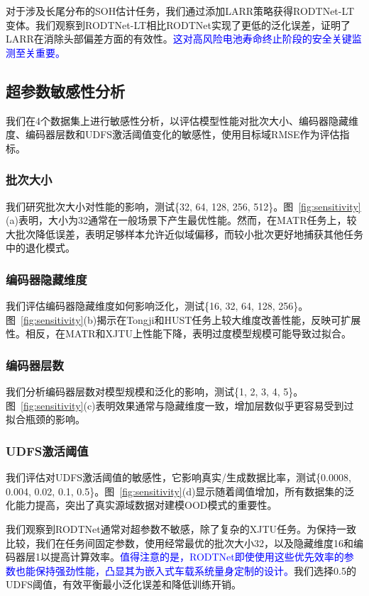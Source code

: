 \documentclass[UTF8,lettersize,journal]{IEEEtran}
\newcommand{\rev}[1]{\textcolor{blue}{#1}}
\begin{document}
对于涉及长尾分布的SOH估计任务，我们通过添加LARR策略获得RODTNet-LT变体。我们观察到RODTNet-LT相比RODTNet实现了更低的泛化误差，证明了LARR在消除头部偏差方面的有效性。\rev{这对高风险电池寿命终止阶段的安全关键监测至关重要。}

\subsection{超参数敏感性分析}

我们在4个数据集上进行敏感性分析，以评估模型性能对批次大小、编码器隐藏维度、编码器层数和UDFS激活阈值变化的敏感性，使用目标域RMSE作为评估指标。

\subsubsection{批次大小}

我们研究批次大小对性能的影响，测试\{32, 64, 128, 256, 512\}。图~\ref{fig:sensitivity}(a)表明，大小为32通常在一般场景下产生最优性能。然而，在MATR任务上，较大批次降低误差，表明足够样本允许近似域偏移，而较小批次更好地捕获其他任务中的退化模式。

\subsubsection{编码器隐藏维度}

我们评估编码器隐藏维度如何影响泛化，测试\{16, 32, 64, 128, 256\}。图~\ref{fig:sensitivity}(b)揭示在Tongji和HUST任务上较大维度改善性能，反映可扩展性。相反，在MATR和XJTU上性能下降，表明过度模型规模可能导致过拟合。

\subsubsection{编码器层数}

我们分析编码器层数对模型规模和泛化的影响，测试\{1, 2, 3, 4, 5\}。图~\ref{fig:sensitivity}(c)表明效果通常与隐藏维度一致，增加层数似乎更容易受到过拟合瓶颈的影响。

\subsubsection{UDFS激活阈值}

我们评估对UDFS激活阈值的敏感性，它影响真实/生成数据比率，测试\{0.0008, 0.004, 0.02, 0.1, 0.5\}。图~\ref{fig:sensitivity}(d)显示随着阈值增加，所有数据集的泛化能力提高，突出了真实源域数据对建模OOD模式的重要性。

我们观察到RODTNet通常对超参数不敏感，除了复杂的XJTU任务。为保持一致比较，我们在任务间固定参数，使用经常最优的批次大小32，以及隐藏维度16和编码器层1以提高计算效率。\rev{值得注意的是，RODTNet即使使用这些优先效率的参数也能保持强劲性能，凸显其为嵌入式车载系统量身定制的设计。}我们选择0.5的UDFS阈值，有效平衡最小泛化误差和降低训练开销。
\end{document}
